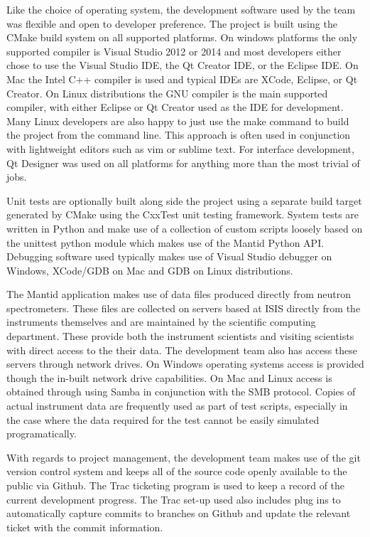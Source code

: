 \documentclass[paper=a4, fontsize=11pt]{scrartcl}	%
\numberwithin{equation}{section}															%
\numberwithin{figure}{section}																%
\numberwithin{table}{section}
\begin{document}
Like the choice of operating system, the development software used by
the team was flexible and open to developer preference. The project is
built using the CMake build system on all supported platforms. On
windows platforms the only supported compiler is Visual Studio 2012 or
2014 and most developers either chose to use the Visual Studio IDE, the
Qt Creator IDE, or the Eclipse IDE. On Mac the Intel C++ compiler is
used and typical IDEs are XCode, Eclipse, or Qt Creator. On Linux
distributions the GNU compiler is the main supported compiler, with
either Eclipse or Qt Creator used as the IDE for development. Many Linux
developers are also happy to just use the make command to build the
project from the command line. This approach is often used in
conjunction with lightweight editors such as vim or sublime text. For
interface development, Qt Designer was used on all platforms for
anything more than the most trivial of jobs.

Unit tests are optionally built along side the project using a separate
build target generated by CMake using the CxxTest unit testing
framework. System tests are written in Python and make use of a
collection of custom scripts loosely based on the unittest python module
which makes use of the Mantid Python API. Debugging software used
typically makes use of Visual Studio debugger on Windows, XCode/GDB on
Mac and GDB on Linux distributions.

The Mantid application makes use of data files produced directly from
neutron spectrometers. These files are collected on servers based at
ISIS directly from the instruments themselves and are maintained by the
scientific computing department. These provide both the instrument
scientists and visiting scientists with direct access to the their data.
The development team also has access these servers through network
drives. On Windows operating systems access is provided though the
in-built network drive capabilities. On Mac and Linux access is obtained
through using Samba in conjunction with the SMB protocol. Copies of
actual instrument data are frequently used as part of test scripts,
especially in the case where the data required for the test cannot be
easily simulated programatically.

With regards to project management, the development team makes use of
the git version control system and keeps all of the source code openly
available to the public via Github. The Trac ticketing program is used
to keep a record of the current development progress. The Trac set-up
used also includes plug ins to automatically capture commits to branches
on Github and update the relevant ticket with the commit information.
\end{document}
